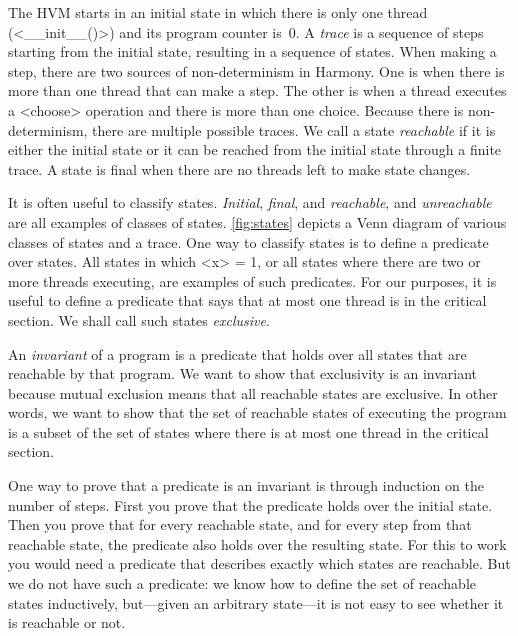 \documentclass{report}
\begin{document}
%
%

The HVM starts in an initial state in which there is only
one thread (<{__init__()}>) and its program counter is~0.
A \emph{trace}
%
is a sequence of steps starting from the initial state,
resulting in a sequence of states.
When making a step, there are two sources of non-determinism
%
in Harmony.
One is when
there is more than one thread that can make a step.  The other is
when a thread executes a <{choose}> operation and there is
more than one choice.
Because there is non-determinism, there are multiple possible traces.
We call a state \emph{reachable}
%
if it is either the initial state
or it can be reached from the initial state through a finite trace.
A state is final
when there are no threads left to make state changes.

It is often useful to classify states.
\emph{Initial}, \emph{final}, and \emph{reachable}, and \emph{unreachable}
are all examples of classes of states.
\autoref{fig:states} depicts a Venn diagram of various classes of states
and a trace.
One way to classify states is to define a predicate over states.
All states in which <{x}> = 1, or all states where
there are two or more threads executing, are examples of such predicates.
For our purposes, it is useful to define a predicate that says that at
most one thread is in the critical section.  We shall call such states
\emph{exclusive}.

An \emph{invariant} of a program
%
is a predicate that holds over all states that are reachable by that program.
We want to show that exclusivity is an invariant because mutual exclusion means
that all reachable states are exclusive.
In other words, we want to show that the set of reachable states of executing
the program
is a subset of the set of states where there is at most one thread in the critical
section.

One way to prove that a predicate is an invariant is through induction
on the number of steps.  First you prove that the predicate holds over
the initial state.  Then you prove that for every reachable state,
and for every step from that reachable state, the predicate also holds
over the resulting state.
For this to work you would need a predicate that describes exactly which
states are reachable.
But we do not have such a predicate: we know how to define the set
of reachable states inductively, but---given an arbitrary state---it is not
easy to see whether it is reachable or not.
\end{document}
